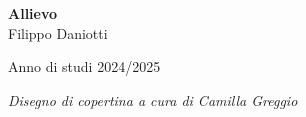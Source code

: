 \documentclass[class=book, crop=false, oneside, a4paper]{standalone}
\begin{document}
\begin{titlepage}
        
        \raggedleft
        
        \Large
        \textbf{Allievo}
        \vspace{0.125cm}\\
        \large
        Filippo Daniotti
        
        
        
        \begin{center}
            \vspace{1cm}
            Anno di studi 2024/2025 
        \end{center}
        
    \end{titlepage}
    \clearpage

    \thispagestyle{empty}
    \vspace*{\fill}
    \begin{center}
        \textit{Disegno di copertina a cura di Camilla Greggio}
    \end{center}
    \clearpage
\end{document}
